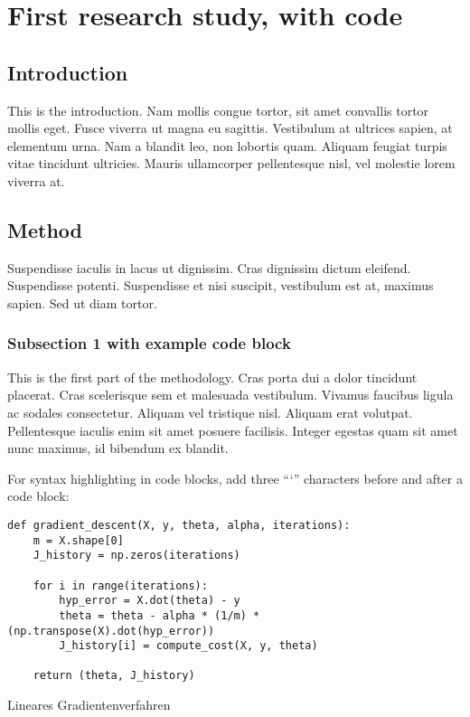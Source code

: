 \hypertarget{first-research-study-with-code}{%
\section{First research study, with
code}\label{first-research-study-with-code}}

\hypertarget{introduction}{%
\subsection{Introduction}\label{introduction}}

This is the introduction. Nam mollis congue tortor, sit amet
convallis tortor mollis eget. Fusce viverra ut magna eu sagittis.
Vestibulum at ultrices sapien, at elementum urna. Nam a blandit leo,
non lobortis quam. Aliquam feugiat turpis vitae tincidunt ultricies.
Mauris ullamcorper pellentesque nisl, vel molestie lorem viverra at.

\hypertarget{method}{%
\subsection{Method}\label{method}}

Suspendisse iaculis in lacus ut dignissim. Cras dignissim dictum
eleifend. Suspendisse potenti. Suspendisse et nisi suscipit,
vestibulum est at, maximus sapien. Sed ut diam tortor.

\hypertarget{subsection-1-with-example-code-block}{%
\subsubsection{Subsection 1 with example code
block}\label{subsection-1-with-example-code-block}}

This is the first part of the methodology. Cras porta dui a dolor
tincidunt placerat. Cras scelerisque sem et malesuada vestibulum.
Vivamus faucibus ligula ac sodales consectetur. Aliquam vel
tristique nisl. Aliquam erat volutpat. Pellentesque iaculis enim sit
amet posuere facilisis. Integer egestas quam sit amet nunc maximus,
id bibendum ex blandit.

For syntax highlighting in code blocks, add three \enquote{`}
characters before and after a code block:

\begin{listing}[htbp]
\begin{verbatim}
def gradient_descent(X, y, theta, alpha, iterations):
    m = X.shape[0]
    J_history = np.zeros(iterations)

    for i in range(iterations):
        hyp_error = X.dot(theta) - y
        theta = theta - alpha * (1/m) * (np.transpose(X).dot(hyp_error))
        J_history[i] = compute_cost(X, y, theta)

    return (theta, J_history)
\end{verbatim}
\caption{Lineares Gradientenverfahren
\autocite[vgl.][33-35]{Press_NumericalRecipes_2007}}
\label{linear-gradient-descent}
\end{listing}

